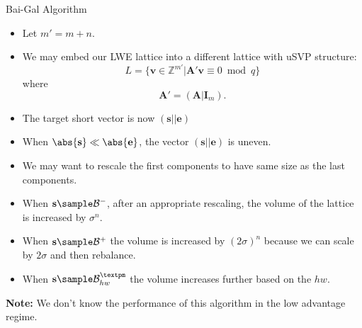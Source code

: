 \documentclass[10pt,compress]{beamer}
\renewcommand{\vec}[1]{\mathbf{#1}\xspace}
\newcommand{\s}{\vec{s}}
\renewcommand{\B}[2][]{\ensuremath{\mathcal{B}_{#1}^{#2}}\xspace}
\renewcommand{\vec}[1]{\mathbf{#1}\xspace}
\newcommand{\Z}{\ensuremath{\mathbb{Z}}\xspace}
\begin{document}
\begin{frame}{Bai-Gal Algorithm}
  \begin{itemize}
  \item Let $m'=m+n$. 
  \item We may embed our LWE lattice into a different lattice with uSVP structure:
    \[L=\{ \vec{v} \in \Z^{m'} | \vec{A}' \vec{v} \equiv 0 \bmod{q} \}\] where \[\vec{A}' = (\vec{A} | \vec{I}_m ).\]
    \item The target short vector is now $(\s || \vec{e})$  
    \item When $\abs{\s} \ll \abs{\vec{e}}$, the vector $(\s || \vec{e})$ is uneven. 
    \item We may want to rescale the first components to have same size as the last components.
    
      \framebreak{}

    \item When $\s \sample \B{-}$, after an appropriate rescaling, the volume of the lattice is increased by $\sigma^n$.
    \item When $\s \sample \B{+}$ the volume is increased by ${(2\sigma)}^n$ because we can scale by $2\sigma$ and then rebalance.

    \item When $\s \sample \B[hw]{±}$ the volume increases further based on the $hw$.

    \end{itemize}


  \framebreak{}

  \begin{center}
  \end{center}

  \textbf{Note:} We don't know the performance of this algorithm in the low advantage regime.
    
\end{frame}
\end{document}
